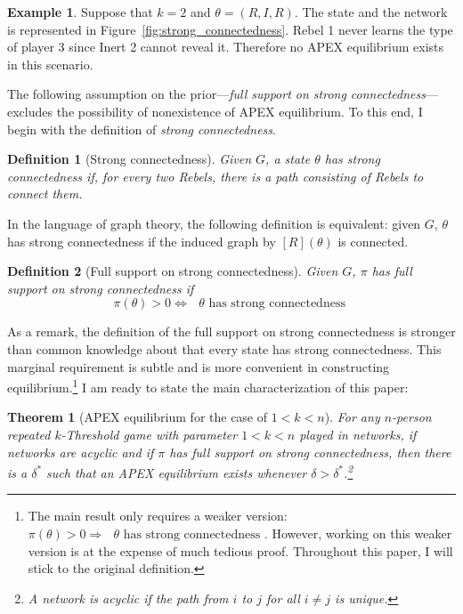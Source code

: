 \documentclass[12pt,letter]{article}
\newtheorem{theorem}{Theorem}
\newtheorem{definition}{Definition}[section]
\theoremstyle{definition}
\newtheorem{example}{Example}
\theoremstyle{remark}
\theoremstyle{claim}
\begin{document}
\begin{example}\label{ex_strong_connectedness}
Suppose that $k=2$ and $\theta=(R,I,R)$. The state and the network is represented in Figure~\ref{fig:strong_connectedness}. Rebel 1 never learns the type of player 3 since Inert 2 cannot reveal it. Therefore no APEX equilibrium exists in this scenario.
\end{example}

The following assumption on the prior---\textit{full support on strong connectedness}---excludes the possibility of nonexistence of APEX equilibrium. To this end, I begin with the definition of \textit{strong connectedness}.

\begin{definition}[Strong connectedness]
Given $G$, a state $\theta$ has strong connectedness if, for every two Rebels, there is a path consisting of Rebels to connect them.

\end{definition}  

In the language of graph theory, the following definition is equivalent: given $G$, $\theta$ has strong connectedness if the induced graph by $[R](\theta)$ is connected.

\begin{definition}[Full support on strong connectedness]
Given $G$, $\pi$ has full support on strong connectedness if 
\[\pi(\theta)>0\Leftrightarrow \text{ $\theta$ has strong connectedness }\] 
\end{definition}  

As a remark, the definition of the full support on strong connectedness is stronger than common knowledge about that every state has strong connectedness. This marginal requirement is subtle and is more convenient in constructing equilibrium.\footnote{The main result only requires a weaker version: $\pi(\theta)>0\Rightarrow \text{ $\theta$ has strong connectedness }$. However, working on this weaker version is at the expense of much tedious proof. Throughout this paper, I will stick to the original definition.} I am ready to state the main characterization of this paper:

\begin{theorem}[APEX equilibrium for the case of $1<k<n$]
\label{thm_main_result}
For any $n$-person repeated $k$-Threshold game with parameter $1<k<n$ played in networks, if networks are acyclic and if $\pi$ has full support on strong connectedness, then there is a $\delta^{*}$ such that an APEX equilibrium exists whenever $\delta>\delta^{*}$.\footnote{A network is acyclic if the path from $i$ to $j$ for all $i\neq j$ is unique.}

\end{theorem}
\end{document}
